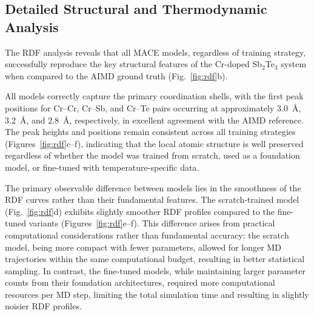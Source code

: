 \documentclass[pdflatex,sn-mathphys-num]{sn-jnl}%
\theoremstyle{thmstyleone}%
\theoremstyle{thmstyletwo}%
\theoremstyle{thmstylethree}%
\begin{document}
\subsection{Detailed Structural and Thermodynamic Analysis}
The RDF analysis reveals that all MACE models, regardless of training strategy, successfully reproduce the key structural features of the Cr-doped Sb$_2$Te$_3$ system when compared to the AIMD ground truth (Fig.~\ref{fig:rdf}b).

All models correctly capture the primary coordination shells, with the first peak positions for Cr--Cr, Cr--Sb, and Cr--Te pairs occurring at approximately 3.0~\AA, 3.2~\AA, and 2.8~\AA, respectively, in excellent agreement with the AIMD reference. The peak heights and positions remain consistent across all training strategies (Figures~\ref{fig:rdf}c--f), indicating that the local atomic structure is well preserved regardless of whether the model was trained from scratch, used as a foundation model, or fine-tuned with temperature-specific data.

The primary observable difference between models lies in the smoothness of the RDF curves rather than their fundamental features. The scratch-trained model (Fig.~\ref{fig:rdf}d) exhibits slightly smoother RDF profiles compared to the fine-tuned variants (Figures~\ref{fig:rdf}e--f). This difference arises from practical computational considerations rather than fundamental accuracy: the scratch model, being more compact with fewer parameters, allowed for longer MD trajectories within the same computational budget, resulting in better statistical sampling. In contrast, the fine-tuned models, while maintaining larger parameter counts from their foundation architectures, required more computational resources per MD step, limiting the total simulation time and resulting in slightly noisier RDF profiles.

\end{document}
